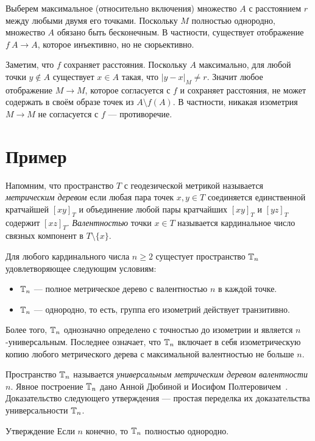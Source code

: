 \documentclass[a4paper,10pt]{article}
\begin{document}
Выберем максимальное (относительно включения) множество $A$ с расстоянием $r$ между любыми двумя его точками.
Поскольку $M$ полностью однородно, множество $A$ обязано быть бесконечным.
В частности, существует отображение $f\:A\to A$, которое инъективно, но не сюрьективно.

Заметим, что $f$ сохраняет расстояния.
Поскольку $A$ максимально, для любой точки $y\notin A$ существует $x\in A$ такая, что $|y-x|_M\ne r$.
Значит любое отображение $M\to M$, которое согласуется с $f$ и сохраняет расстояния, не может содержать в своём образе точек из $A\setminus f(A)$.
В частности, никакая изометрия $M\to M$ не согласуется с $f$ --- противоречие.
\qeds

\section{Пример}

Напомним, что пространство $T$ с геодезической метрикой называется \emph{метрическим деревом} если любая пара точек $x,y\in T$ соединяется единственной кратчайшей $[xy]_T$ и объединение любой пары кратчайших $[xy]_T$ и $[yz]_T$ содержит $[xz]_T$.
\emph{Валентностью} точки $x\in T$ называется кардинальное число связных компонент в $T\setminus\{x\}$.

Для любого кардинального числа $n\ge 2$ сущестует пространство $\mathbb{T}_n$ удовлетворяющее следующим условиям:
\begin{itemize}
\item $\mathbb{T}_n$ --- полное метрическое дерево с валентностью $n$ в каждой точке.
\item $\mathbb{T}_n$ --- однородно, то есть, группа его изометрий действует транзитивно. 
\end{itemize}
Более того, $\mathbb{T}_n$ однозначно определено с точностью до изометрии и является $n$-универсальным.
Последнее означает, что $\mathbb{T}_n$ включает в себя изометрическую копию любого метрического дерева с максимальной валентностью не больше $n$.

Пространство $\mathbb{T}_n$ называется \emph{универсальным метрическим деревом валентности $n$}.
Явное построение $\mathbb{T}_n$ дано Анной Дюбиной и Иосифом Полтеровичем~\cite{dyubina-polterovich}.
Доказательство следующего утверждения --- простая переделка их доказательства универсальности $\mathbb{T}_n$.

\begin{thm}{Утверждение}
Если $n$ конечно, то $\mathbb{T}_n$ полностью однородно.
\end{thm}
\end{document}
